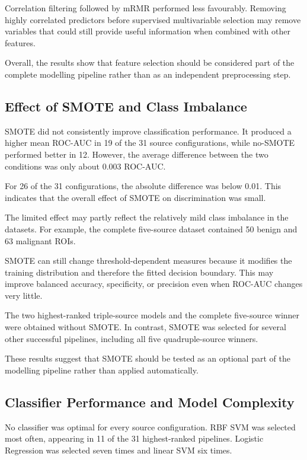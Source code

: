 \documentclass[12pt,twocolumn]{article}
\begin{document}
Correlation filtering followed by mRMR performed less favourably.
Removing highly correlated predictors before supervised multivariable
selection may remove variables that could still provide useful
information when combined with other features.

Overall, the results show that feature selection should be considered
part of the complete modelling pipeline rather than as an independent
preprocessing step.


\subsection{Effect of SMOTE and Class Imbalance}
\label{subsec:discussion_smote}

SMOTE did not consistently improve classification performance. It
produced a higher mean ROC-AUC in 19 of the 31 source configurations,
while no-SMOTE performed better in 12. However, the average difference
between the two conditions was only about 0.003 ROC-AUC.

For 26 of the 31 configurations, the absolute difference was below
0.01. This indicates that the overall effect of SMOTE on discrimination
was small.

The limited effect may partly reflect the relatively mild class
imbalance in the datasets. For example, the complete five-source
dataset contained 50 benign and 63 malignant ROIs.

SMOTE can still change threshold-dependent measures because it modifies
the training distribution and therefore the fitted decision boundary.
This may improve balanced accuracy, specificity, or precision even when
ROC-AUC changes very little.

The two highest-ranked triple-source models and the complete
five-source winner were obtained without SMOTE. In contrast, SMOTE was
selected for several other successful pipelines, including all five
quadruple-source winners.

These results suggest that SMOTE should be tested as an optional part
of the modelling pipeline rather than applied automatically.


\subsection{Classifier Performance and Model Complexity}
\label{subsec:discussion_classifiers}

No classifier was optimal for every source configuration. RBF SVM was
selected most often, appearing in 11 of the 31 highest-ranked
pipelines. Logistic Regression was selected seven times and linear SVM
six times.
\end{document}
